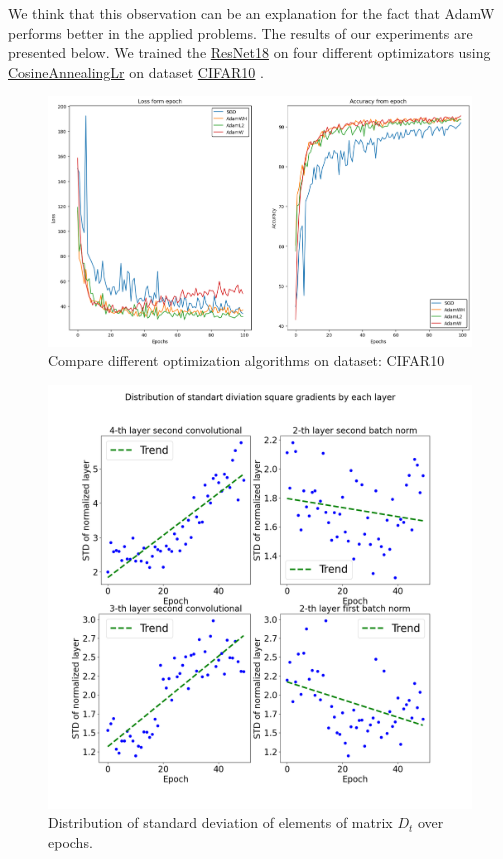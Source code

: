 \documentclass[USenglish]{article}
\theoremstyle{dgthm}
\theoremstyle{dgdef}
\begin{document}
We think that this observation can be an explanation for the fact that AdamW performs better in the applied problems.
The results of our experiments are presented below.
We trained the \href{https://pytorch.org/vision/main/models/generated/torchvision.models.resnet18.html}{ResNet18} \citep{he2015deep} on four different optimizators using \href{https://pytorch.org/docs/stable/generated/torch.optim.lr_scheduler.CosineAnnealingLR.html}{CosineAnnealingLr} on dataset \href{https://www.cs.toronto.edu/~kriz/cifar.html}{CIFAR10} \citep{li2017cifar10}.

\begin{figure}[H]
    \includegraphics[width=\textwidth]{pictures/nn_results.png}
    \captionsetup{justification=centering,margin=2cm}
    \caption{Compare different optimization algorithms on dataset: CIFAR10}
        \label{fig:main_resnet18}
\end{figure}

\begin{figure}[H]
\centering
    \includegraphics[width=\textwidth]{pictures/new_layers.png}
    \captionsetup{justification=centering,margin=2cm}
    \caption{Distribution of standard deviation of elements of matrix $D_t$ over epochs.}
    \label{fig:deviation}
\end{figure}
\end{document}
